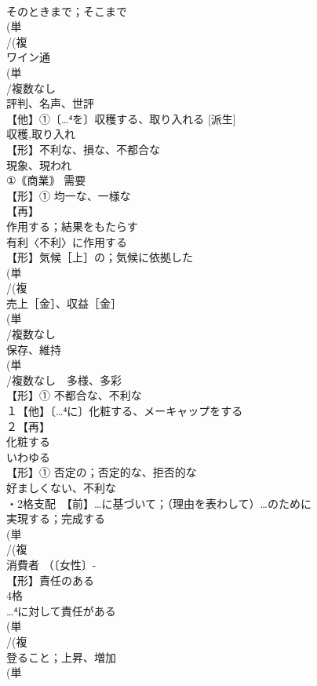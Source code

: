 \documentclass[8pt]{extreport}
\begin{document}
\begin{CJK}{UTF8}{min}
\\	そのときまで；そこまで
\\	(単
\\	/(複
\\	ワイン通
\\	(単
\\	/複数なし 
\\	評判、名声、世評
\\	【他】①〔…⁴を〕収穫する、取り入れる [派生] 
\\	収穫,取り入れ
\\	【形】不利な、損な、不都合な 
\\	現象、現われ 
\\	①｟商業｠ 需要 
\\	【形】① 均一な、一様な
\\	【再】
\\	作用する；結果をもたらす 
\\	有利〈不利〉に作用する
\\	【形】気候［上］の；気候に依拠した
\\	(単
\\	/(複
\\	売上［金］、収益［金］
\\	(単
\\	/複数なし　
\\	保存、維持
\\	(単
\\	/複数なし　多様、多彩
\\	【形】① 不都合な、不利な
\\	１【他】〔…⁴に〕化粧する、メーキャップをする 
\\	２【再】
\\	化粧する
\\	いわゆる 
\\	【形】① 否定の；否定的な、拒否的な 
\\	好ましくない、不利な
\\	・2格支配　【前】…に基づいて；（理由を表わして）…のために
\\	実現する；完成する
\\	(単
\\	/(複
\\	消費者 （〔女性〕-
\\	【形】責任のある 
\\	4格 
\\	…⁴に対して責任がある
\\	(単
\\	/(複
\\	登ること；上昇、増加 
\\	(単

\end{CJK}
\end{document}
